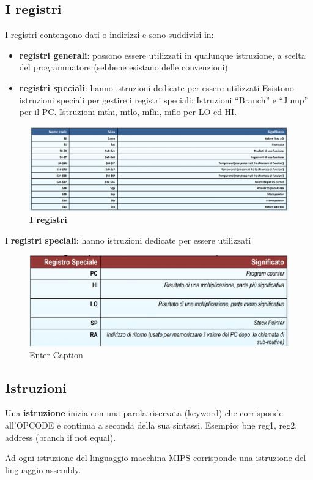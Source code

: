 \documentclass[12pt]{article} %
\begin{document}
\subsection{I registri}
I registri contengono dati o indirizzi e sono suddivisi in:
\begin{itemize}
 \item \textbf{registri generali}: possono essere utilizzati in qualunque istruzione, a scelta del programmatore (sebbene esistano delle convenzioni)
\item \textbf{registri speciali}: hanno istruzioni dedicate per essere utilizzati
Esistono istruzioni speciali per gestire i registri speciali: Istruzioni “Branch” e “Jump” per il PC. Istruzioni mthi, mtlo, mfhi, mflo per LO ed HI.
\end{itemize}
\newpage
\begin{figure}[h]
\centering
\includegraphics[width=1\linewidth]{registrri-mars.png}
\caption{\textbf{I registri}}
\label{fig:enter-label}
\end{figure}
\vspace{\baselineskip}
I \textbf{registri speciali}: hanno istruzioni dedicate per essere utilizzati
\begin{figure}[h]
\centering
\includegraphics[width=1\linewidth]{registri speciali.png}
\caption{Enter Caption}
\label{fig:enter-label}
\end{figure}
\newpage
\subsection{Istruzioni}
Una \textbf{istruzione} inizia con una parola riservata (keyword) che corrisponde all’OPCODE e continua a seconda della sua sintassi. Esempio: bne reg1, reg2, address (branch if not equal).\par\medskip\noindent
Ad ogni istruzione del linguaggio macchina MIPS corrisponde una istruzione del linguaggio assembly.
\end{document}
